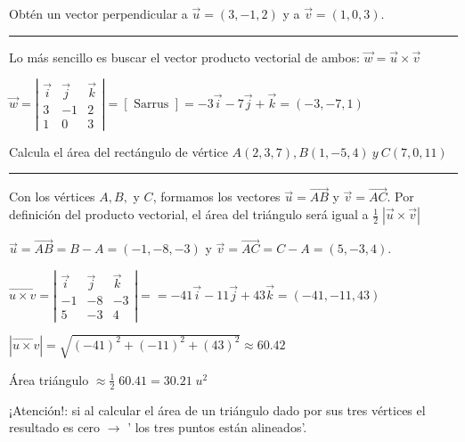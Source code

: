 \begin{miejercicio}
	
	Obtén un vector perpendicular a $\vec u=(3,-1,2)$ y  a $\vec v=(1,0,3)$.

\rule{200pt}{0.1pt}
	
	Lo más sencillo es buscar el vector producto vectorial de ambos: $ \vec w =\vec u \times \vec v$
	
	$\overrightarrow { w } =\left| \begin{matrix} \vec { i }  & \vec { j }  & \vec { k }  \\ 3 & -1 & 2 \\ 1 & 0 & 3 \end{matrix} \right| =[\text{ Sarrus }] =-3\vec { i } -7\vec { j } +\vec { k } =(-3,-7,1)$
\end{miejercicio}
\vspace{3mm}



\begin{miejercicio}

	Calcula el área del rectángulo de vértice  $A(2,3,7), B(1,-5,4)\  y\  C(7,0,11)$
\rule{200pt}{0.1pt}

	
Con los vértices $A, B,$ y $C$, formamos los vectores $\vec u=\overrightarrow {AB}$ y $\vec v=\overrightarrow {AC}$. Por definición del producto vectorial, el área del triángulo será igual a $ \frac 1 2 \; | \vec u \times \vec v |$

$\vec u=\overrightarrow {AB}=B-A=(-1,-8,-3)$ y $\vec v=\overrightarrow {AC}= C-A=(5, -3, 4)$.

$\overrightarrow { u \times v } =\left| \begin{matrix} \vec { i }  & \vec { j }  & \vec { k }  \\ -1 & -8 & -3 \\ 5 & -3 & 4 \end{matrix} \right| ==-41\vec { i } -11\vec { j } +43\vec { k } =(-41,-11,43)$

$|\overrightarrow { u \times v } | = \sqrt{(-41)^2+(-11)^2+(43)^2}\approx 60.42$

Área triángulo $ \approx  \frac 1 2 \; 60.41 = 30.21\; u^2$

¡Atención!: si al calcular el área de un triángulo dado por sus tres vértices el resultado es cero $\to$ ' los tres puntos están alineados'.
\end{miejercicio}

